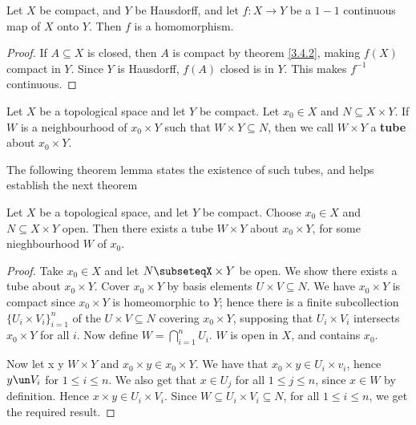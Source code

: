 \begin{theorem}\label{3.4.5}
    Let $X$ be compact, and  $Y$ be Hausdorff, and let  $f:X \rightarrow Y$ be a $1-1$ continuous
    map of  $X$ onto  $Y$. Then  $f$ is a homomorphism.
\end{theorem}
\begin{proof}
    If $A \subseteq X$ is closed, then  $A$ is compact by theorem \ref {3.4.2}, making $f(X)$
    compact in $Y$. Since  $Y$ is Hausdorff,  $f(A)$ closed is in $Y$. This makes $f^{-1}$
    continuous.
\end{proof}

\begin{definition}
    Let $X$ be a topological space and let  $Y$ be compact. Let  $x_0 \in X$ and $N \subseteq X
    \times Y$. If  $W$ is a neighbourhood of  $x_0 \times Y$ such that $W \times Y \subseteq N$,
    then we call  $W \times Y$ a  \textbf{tube} about $x_0 \times Y$.
\end{definition}

The following theorem lemma states the existence of such tubes, and helps establish the next theorem

\begin{lemma}\label{3.4.6}
    Let $X$ be a topological space, and let  $Y$ be compact. Choose  $x_0 \in X$ and $N \subseteq X
    \times Y$ open. Then there exists a tube  $W \times Y$ about  $x_0 \times Y$, for some
    nieghbourhood $W$ of  $x_0$.
\end{lemma}
\begin{proof}
    Take $x_0 \in X$ and let $N \subseteqX \times Y$ be open. We show there exists a tube about
    $x_0 \times Y$. Cover $x_0 \times Y$ by basis elements $U \times V \subseteq N$. We have  $x_0
    \times Y$ is compact since $x_0 \times Y$ is homeomorphic to $Y$; hence there is a finite
    subcollection  $\{U_i \times V_i\}_{i=1}^n$ of the $U \times V \subseteq N$ covering  $x_0
    \times Y$, supposing that $U_i \times V_i$ intersects  $x_0 \times Y$ for all $i$. Now define
    $W=\bigcap_{i=1}^n{U_i}$. $W$ is open in  $X$, and contains  $x_0$.

    Now let x \times y \in $W \times Y$ and  $x_0 \times y \in x_0 \times Y$. We have that $x_0
    \times y \in U_i \times v_i$, hence $y \un V_i$ for  $1 \leq i \leq n$. We also get that  $x \in
    U_j$ for all  $1 \leq j \leq n$, since  $x \in W$ by definition. Hence  $x \times y \in U_i
    \times V_i$. Since  $W \subseteq U_i \times V_i \subseteq N$, for all  $1 \leq i \leq n$, we get
    the required result.
\end{proof}

